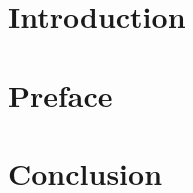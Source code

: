 







\section*{Introduction}



\section*{Preface}

\newpage

\tableofcontents








\section{Conclusion}

